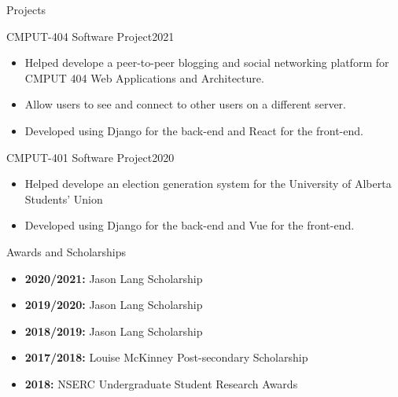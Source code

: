 \documentclass[]{mcdowellcv}
\begin{document}
\vspace*{-10pt}
\begin{cvsection}{Projects}
  \begin{cvsubsection}{CMPUT-404 Software Project}{}{2021}
    \begin{itemize}
      \item Helped develope a peer-to-peer blogging and social networking platform for CMPUT 404 Web Applications and Architecture.
      \item Allow users to see and connect to other users on a different server. 
      \item Developed using Django for the back-end and React for the front-end. 
    \end{itemize}
  \end{cvsubsection}

  \begin{cvsubsection}{CMPUT-401 Software Project}{}{2020}
    \begin{itemize}
      \item Helped develope an election generation system for the University of Alberta Students' Union
      \item Developed using Django for the back-end and Vue for the front-end.
    \end{itemize}
  \end{cvsubsection}
\end{cvsection}

\vspace*{-10pt}
\begin{cvsection}{Awards and Scholarships}
  \begin{cvsubsection}{}{}{}
    \begin{itemize}
      \item \textbf{2020/2021:} Jason Lang Scholarship
      \item \textbf{2019/2020:} Jason Lang Scholarship
      \item \textbf{2018/2019:} Jason Lang Scholarship
      \item \textbf{2017/2018:} Louise McKinney Post-secondary Scholarship 
      \item \textbf{2018:} NSERC Undergraduate Student Research Awards
    \end{itemize}
  \end{cvsubsection}
\end{cvsection}
\end{document}
